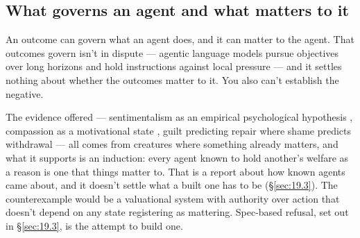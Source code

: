 \subsection{What governs an agent and what matters to it}
\label{sec:21.2.2}
An outcome can govern what an agent does, and it can matter to the agent. That outcomes govern isn't in dispute — agentic language models pursue objectives over long horizons and hold instructions against local pressure — and it settles nothing about whether the outcomes matter to it. You also can't establish the negative.

The evidence offered — sentimentalism as an empirical psychological hypothesis \autocite{nichols2004sentimental}, compassion as a motivational state \autocite{goetz2010compassion}, guilt predicting repair where shame predicts withdrawal \autocite{tangney2007moral} — all comes from creatures where something already matters, and what it supports is an induction: every agent known to hold another's welfare as a reason is one that things matter to. That is a report about how known agents came about, and it doesn't settle what a built one has to be (\S\ref{sec:19.3}). The counterexample would be a valuational system with authority over action that doesn't depend on any state registering as mattering. Spec-based refusal, set out in \S\ref{sec:19.3}, is the attempt to build one.
